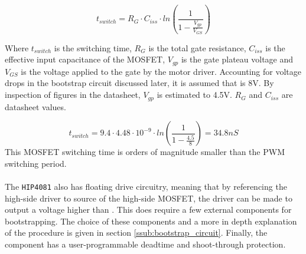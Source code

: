 \begin{equation}
t_{switch} = R_G \cdot C_{iss} \cdot ln\left(\frac{1}{1-\frac{V_{gp}}{V_{GS}}}\right) 
\label{eq:mosfet_turn_on}
\end{equation}

Where $t_{switch}$ is the switching time, $R_G$ is the total gate resistance, $C_{iss}$ is the effective input capacitance of the
MOSFET, $V_{gp}$ is the gate plateau voltage and $V_{GS}$ is the voltage applied to the gate by the motor driver.
Accounting for voltage drops in the bootstrap circuit discussed later,  it is assumed that \vgs is 8V.
By inspection of figures in the datasheet, $V_{gp}$ is estimated to 4.5V.
$R_G$ and $C_{iss}$ are datasheet values.

\begin{equation}
t_{switch} = 9.4 \cdot 4.48 \cdot 10^{-9} \cdot ln\left(\frac{1}{1-\frac{4.5}{8}}\right) = 34.8 nS 
\label{eq:mosfet_turn_on_values}
\end{equation}
This MOSFET switching time is orders of magnitude smaller than the PWM switching period.
\\~\\
The \texttt{HIP4081} also has floating drive circuitry, meaning that by referencing the high-side driver to source of the high-side MOSFET, the driver can be made to output a voltage higher than \vcc.
This does require a few external components for bootstrapping.
The choice of these components and a more in depth explanation of the procedure is given in section \ref{ssub:bootstrap_circuit}.
Finally, the component has a user-programmable deadtime and shoot-through protection. 

